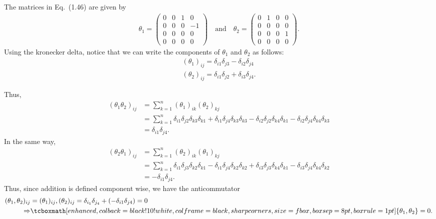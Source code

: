 
The matrices in Eq.~(1.46) are given by
\begin{eqnarray}
    \label{eq:matrices-1.46}
    \theta_1 = 
    \begin{pmatrix}
    0 & 0 & 1 & 0 \\
    0 & 0 & 0 & -1 \\
    0 & 0 & 0 & 0 \\
    0 & 0 & 0 & 0
    \end{pmatrix}
    \quad
    \mbox{and}
    \quad
    \theta_2 = 
    \begin{pmatrix}
        0 & 1 & 0 & 0 \\
        0 & 0 & 0 & 0 \\
        0 & 0 & 0 & 1 \\
        0 & 0 & 0 & 0
    \end{pmatrix}
.\end{eqnarray}
Using the kronecker delta, notice that we can write the components of $\theta_1$ and $\theta_2$ as follows:
\begin{eqnarray}
    \label{eq:components-th12}
    (\theta_1)_{ij} = \delta_{i 1}\delta_{j 3} - \delta_{i 2}\delta_{j 4} \\
    (\theta_2)_{ij} = \delta_{i 1}\delta_{j 2} + \delta_{i 3}\delta_{j 4}
.\end{eqnarray}

Thus,
\begin{align}
    \label{eq:th1-th2-prod}
    (\theta_1\theta_2)_{ij} &= \sum_{k=1}^{n} (\theta_1)_{ik}(\theta_2)_{kj} \\
                            &= \sum_{k=1}^{n} \delta_{i 1}\delta_{j 2}\delta_{k 3}\delta_{k 1} + \delta_{i 1}\delta_{j 4}\delta_{k 3}\delta_{k 3} - \delta_{i 2}\delta_{j 2}\delta_{k 4}\delta_{k 1} - \delta_{i 2}\delta_{j 4}\delta_{k 4}\delta_{k 3} \\
                            &= \delta_{i 1}\delta_{j 4}
.\end{align}
In the same way,
\begin{align}
    \label{eq:th2-th1-prod}
    (\theta_2\theta_1)_{ij} &= \sum_{k=1}^{n} (\theta_2)_{ik}(\theta_1)_{kj} \\
                            &= \sum_{k=1}^{n} \delta_{i 1}\delta_{j 3}\delta_{k 2}\delta_{k 1} - \delta_{i 1}\delta_{j 4}\delta_{k 2}\delta_{k 2} + \delta_{i 3}\delta_{j 3}\delta_{k 4}\delta_{k 1} - \delta_{i 3}\delta_{j 4}\delta_{k 4}\delta_{k 2} \\
                            &= -\delta_{i 1}\delta_{j 4}
.\end{align}
Thus, since addition is defined component wise, we have the anticommutator
\begin{align}
    \label{eq:anticommutator}
    ({\theta_1,\theta_2})_{ij} &= {(\theta_1)_{ij},(\theta_2)_{ij}} = \delta_{i_1}\delta_{j_4} + (-\delta_{i 1}\delta_{j 4}) = 0 \\
    \Rightarrow& \eqbox{\{\theta_1,\theta_2\} = 0}
.\end{align}


